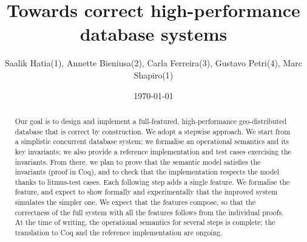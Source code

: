 \documentclass[systeme,french,english]{compas2022}
\begin{document}

\title{Towards correct high-performance database systems}

\author{Saalik Hatia(1), Annette Bieniusa(2), Carla Ferreira(3), Gustavo Petri(4), Marc Shapiro(1)}


\address{
  (1)~LIP6--Sorbonne-Université, Paris, France  \\
  (2)~TU Kaiserslautern, Germany \\
  (3)~Universidade NOVA de Lisboa, Portugal \\
  (4)~ARM, Cambridge, United Kingdom\\
  }

\date{\today}

\maketitle

\begin{abstract}
  Our goal is to design and implement a full-featured, high-performance
  geo-distributed database that is correct by construction.
  We adopt a stepwise approach.
  We start from a simplistic concurrent database system; we formalise an
  operational semantics and its key invariants; we also provide a
  reference implementation and test cases exercising the invariants.
  From there, we plan to prove that the semantic model satisfies the
  invariants (proof in Coq), and to check that the implementation respects
  the model thanks to litmus-test cases.
  Each following step adds a single feature.
  We formalise the feature, and expect to show formally and experimentally
  that the improved system simulates the simpler one.
  We expect that the features compose, so that the correctness of the full
  system with all the features follows from the individual proofs.
  At the time of writing, the operational semantics for several steps is
  complete; the translation to Coq and the reference implementation are
  ongoing.

\end{abstract}


\end{document}
